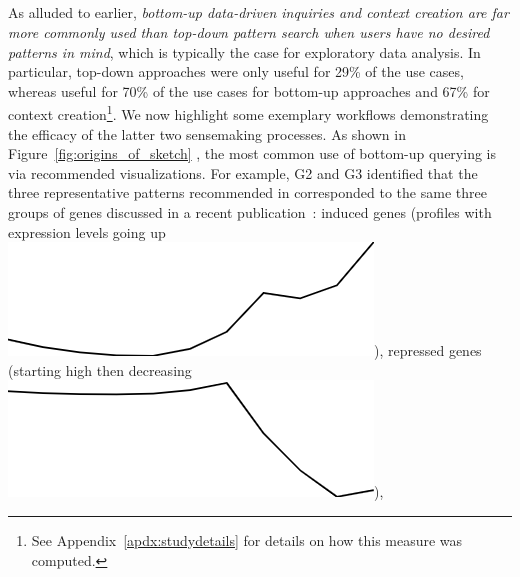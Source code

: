  \subsection{}%
 \par As alluded to earlier,
 \emph{bottom-up data-driven inquiries
 and context creation are far more commonly
 used than top-down pattern search
 when users have no desired patterns in mind},
 which is typically the case for exploratory data analysis.
 In particular, top-down approaches were only useful for 29\% of the use cases,
 whereas  useful for 70\% of the use cases
 for bottom-up approaches and 67\%
 for context creation\footnote{See Appendix~\ref{apdx:studydetails} for details on how this measure was computed.}. We now highlight some exemplary workflows demonstrating the efficacy of the latter two sensemaking processes.
 \npar {} As shown in Figure~\ref{fig:origins_of_sketch} ,
 the most common use of bottom-up querying
 is via recommended visualizations. For example, G2 and G3 identified that
 the three representative patterns
 recommended in \zvpp corresponded
 to the same three groups of genes discussed
 in a recent publication~\cite{Gloss2017}:
 induced genes (profiles with expression levels going up \includegraphics[width=2\baselineskip,keepaspectratio]{figures/induced.png}),
 repressed genes (starting high then decreasing \includegraphics[width=2\baselineskip,keepaspectratio]{figures/repressed.png}),
